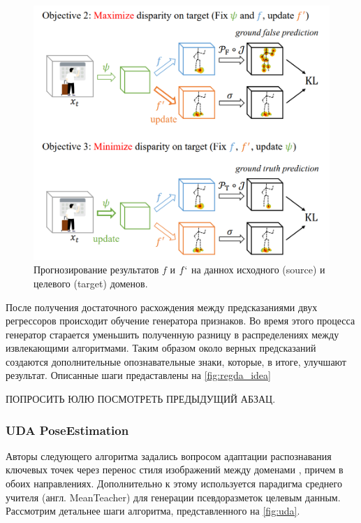\begin{figure}[h]
	\centering
	\includegraphics[width=.8\textwidth]{./images/regda_idea}
	\caption{Прогнозирование результатов $f$ и $f`$ на даннох исходного (source) и целевого (target) доменов. \cite{regda_idea}}
	\label{fig:regda}
\end{figure}

После получения достаточного расхождения между предсказаниями двух регрессоров происходит обучение генератора признаков. Во время этого процесса генератор старается уменьшить полученную разницу в распределениях между извлекающими алгоритмами. Таким образом около верных предсказаний создаются дополнительные опознавательные знаки, которые, в итоге, улучшают результат. Описанные шаги предаставлены на \autoref{fig:regda_idea}

ПОПРОСИТЬ ЮЛЮ ПОСМОТРЕТЬ ПРЕДЫДУЩИЙ АБЗАЦ.


\subsubsection*{UDA PoseEstimation}

Авторы следующего алгоритма задались вопросом адаптации распознавания ключевых точек через перенос стиля изображений между доменами \cite{uda}, причем в обоих направлениях. Дополнительно к этому используется парадигма среднего учителя (англ. MeanTeacher) для генерации псевдоразметок целевым данным. Рассмотрим детальнее шаги алгоритма, представленного на \autoref{fig:uda}.

